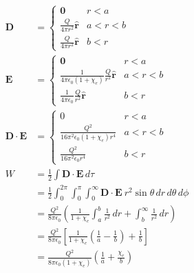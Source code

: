 \documentclass{article}
\renewcommand{\vec}[1]{\boldsymbol{\mathbf{#1}}}
\newcommand{\uvec}[1]{\hat{\vec{#1}}}
\begin{document}
\begin{align*}
  \vec{D}               & = \begin{cases}
                              \vec{0}                      & r < a     \\
                              \frac{Q}{4 \pi r^2} \uvec{r} & a < r < b \\
                              \frac{Q}{4 \pi r^2} \uvec{r} & b < r
                            \end{cases}                                                                                          \\
  \vec{E}               & = \begin{cases}
                              \vec{0}                                                        & r < a     \\
                              \frac{1}{4 \pi \epsilon_0 (1 + \chi_e)} \frac{Q}{r^2} \uvec{r} & a < r < b \\
                              \frac{1}{4 \pi \epsilon_0} \frac{Q}{r^2} \uvec{r}              & b < r
                            \end{cases}                                                        \\
  \vec{D} \cdot \vec{E} & = \begin{cases}
                              0                                                & r < a     \\
                              \frac{Q^2}{16 \pi^2 \epsilon_0 (1 + \chi_e) r^4} & a < r < b \\
                              \frac{Q^2}{16 \pi^2 \epsilon_0 r^4}              & b < r
                            \end{cases}                                                                      \\
  W                     & = \frac{1}{2} \int \vec{D} \cdot \vec{E} \,d \tau                                                                                   \\
                        & = \frac{1}{2} \int_0^{2 \pi} \int_0^\pi \int_0^\infty \vec{D} \cdot \vec{E} \ r^2 \sin \theta \,d r \,d \theta \,d \phi             \\
                        & = \frac{Q^2}{8 \pi \epsilon_0} \left( \frac{1}{1 + \chi_e} \int_a^b \frac{1}{r^2} \,d r + \int_b^\infty \frac{1}{r^2} \,d r \right) \\
                        & = \frac{Q^2}{8 \pi \epsilon_0} \left[ \frac{1}{1 + \chi_e} \left( \frac{1}{a} - \frac{1}{b} \right) + \frac{1}{b} \right]           \\
                        & = \frac{Q^2}{8 \pi \epsilon_0 (1 + \chi_e)} \left( \frac{1}{a} + \frac{\chi_e}{b} \right)
\end{align*}
\end{document}
